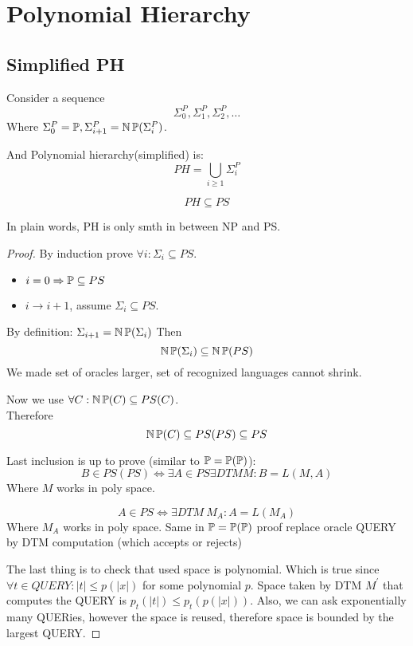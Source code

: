 \section{\texorpdfstring{Polynomial Hierarchy}{Polynomial Hierarchy}}
\vspace{5mm}
\large

\subsection{Simplified PH}

\begin{definition}
	Consider a sequence
	\[ \Sigma_0^P, \Sigma_1^P, \Sigma_2^P, \ldots \]
	Where $\Sigma_0^P = \operatorname{\mathbb{P}}, \Sigma_{i + 1}^P = \operatorname{\operatorname{\mathbb{N}}\mathbb{P}}(\Sigma_i^P)$.

	And Polynomial hierarchy(simplified) is:
	\[ PH = \bigcup_{i \geq 1} \Sigma_i^P \]
\end{definition}

\begin{theorem}
	\[ PH \subseteq PS \]

	In plain words, PH is only smth in between NP and PS.
\end{theorem}
\begin{proof}
	By induction prove $\forall i: \Sigma_i \subseteq PS$.

	\begin{itemize}
		\item $i = 0 \Rightarrow \operatorname{\mathbb{P}} \subseteq PS$
		\item $i \to i + 1$, assume $\Sigma_i \subseteq PS$.
	\end{itemize}

	By definition: $\Sigma_{i + 1} = \operatorname{\operatorname{\mathbb{N}}\mathbb{P}}(\Sigma_i)$
	Then
	\[ \operatorname{\operatorname{\mathbb{N}}\mathbb{P}}(\Sigma_i) \subseteq \operatorname{\operatorname{\mathbb{N}}\mathbb{P}}(PS) \]
	We made set of oracles larger, set of recognized languages cannot shrink.

	Now we use $\forall C: \operatorname{\operatorname{\mathbb{N}}\mathbb{P}}(C) \subseteq PS(C)$.\\
	Therefore
	\[ \operatorname{\operatorname{\mathbb{N}}\mathbb{P}}(C) \subseteq PS(PS) \subseteq PS \]

	Last inclusion is up to prove (similar to $\operatorname{\mathbb{P}} = \operatorname{\mathbb{P}}(\operatorname{\mathbb{P}})$):\\
	\[ B \in PS(PS) \iff \exists A \in PS \exists DTM M: B = L(M, A) \]
	Where $M$ works in poly space.

	\[ A \in PS \iff \exists DTM \ M_A: A = L(M_A) \]
	Where $M_A$ works in poly space.
	Same in $\operatorname{\mathbb{P}} = \operatorname{\mathbb{P}}(\operatorname{\mathbb{P}})$ proof replace oracle QUERY by DTM computation (which accepts or rejects)

	The last thing is to check that used space is polynomial.
	Which is true since $\forall t \in QUERY: |t| \leq p(|x|)$ for some polynomial $p$.
	Space taken by DTM $M^{\prime}$ that computes the QUERY is $p_t(|t|) \leq p_t(p(|x|))$.
	Also, we can ask exponentially many QUERies, however the space is reused, therefore space is bounded by the largest QUERY.
\end{proof}

